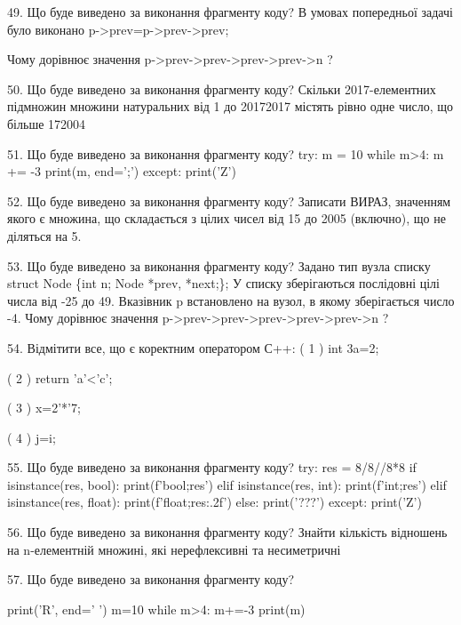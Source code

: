 \documentclass[11pt]{article}
\begin{document}

49. Що буде виведено за виконання фрагменту коду?
В умовах попередньої задачі було виконано p->prev=p->prev->prev;

Чому дорівнює значення p->prev->prev->prev->prev->n ?

50. Що буде виведено за виконання фрагменту коду?
Скільки 2017-елементних підмножин множини натуральних від 1 до 20172017 містять рівно одне число, що більше 172004

51. Що буде виведено за виконання фрагменту коду?
try:
    m = 10
    while m>4:
        m += -3
    print(m, end=';')
except:
    print('Z')


52. Що буде виведено за виконання фрагменту коду?
Записати ВИРАЗ, значенням якого є множина, що складається з цілих чисел від 15 до 2005 (включно), що не діляться на 5.

53. Що буде виведено за виконання фрагменту коду?
Задано тип вузла списку
struct Node \{int n; Node *prev, *next;\};
У списку зберігаються послідовні цілі числа від -25 до 49. Вказівник p встановлено на вузол, в якому зберігається число -4.
Чому дорівнює значення p->prev->prev->prev->prev->prev->n ?

54. %
Відмітити все, що є коректним оператором С++:
( 1 ) int 3a=2;

( 2 ) return 'a'<'c';

( 3 ) x=2'*'7;

( 4 ) j=i;


55. Що буде виведено за виконання фрагменту коду?
try:
    res = 8/8//8*8
    if isinstance(res, bool):
        print(f'bool;{res}')
    elif isinstance(res, int):
        print(f'int;{res}')
    elif isinstance(res, float):
        print(f'float;{res:.2f}')
    else:
        print('???')
except:
    print('Z')


56. Що буде виведено за виконання фрагменту коду?
Знайти кількість відношень на n-елементній множині, які нерефлексивні та несиметричні

57. Що буде виведено за виконання фрагменту коду?

print('R', end=' ')
m=10
while m>4:
    m+=-3
print(m)


\end{document}
